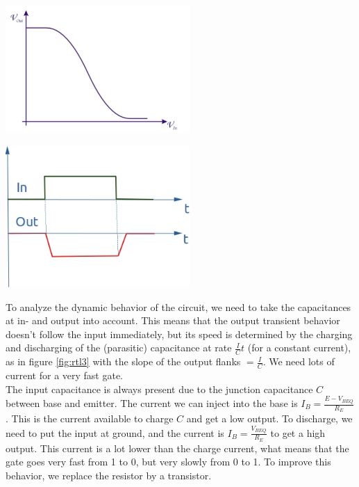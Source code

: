 \begin{minipage}{.5\textwidth}
	\centering
	\includegraphics[width=7cm]{figures/ch15/rtl2.jpg}
	\label{fig:rtl2}
\end{minipage}%
\begin{minipage}{.5\textwidth}
	\centering
	\includegraphics[width=7cm]{figures/ch15/rtl3.jpg}
	\label{fig:rtl3}
\end{minipage}

To analyze the dynamic behavior of the circuit, we need to take the capacitances at in- and output into account. This means that the output transient behavior doesn't follow the input immediately, but its speed is determined by the charging and discharging of the (parasitic) capacitance at rate $\frac{I}{C} t$ (for a constant current), as in figure \ref{fig:rtl3} with the slope of the output flanks $= \frac{I}{C}$. We need lots of current for a very fast gate.\\
The input capacitance is always present due to the junction capacitance $C$ between base and emitter. The current we can inject into the base is $I_B = \frac{E - V_{BEQ}}{R_E}$. This is the current available to charge $C$ and get a low output. To discharge, we need to put the input at ground, and the current is $I_B = \frac{V_{BEQ}}{R_E}$ to get a high output. This current is a lot lower than the charge current, what means that the gate goes very fast from 1 to 0, but very slowly from 0 to 1. To improve this behavior, we replace the resistor by a transistor.\\

